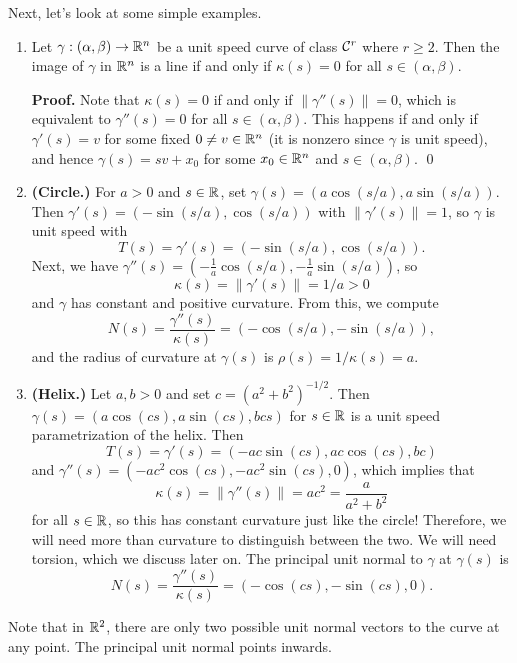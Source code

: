 Next, let's look at some simple examples. 
\begin{enumerate}[(1)]
    \item Let $\gamma : (\alpha, \beta) \to \mathbb{R}^n$ be a unit speed curve 
    of class ${\cal C}^r$ where $r \geq 2$. Then the image of $\gamma$ in $\mathbb{R}^n$ 
    is a line if and only if $\kappa(s) = 0$ for all $s \in (\alpha, \beta)$. 

    {\bf Proof.} Note that $\kappa(s) = 0$ if and only if $\|\gamma''(s)\| = 0$, 
    which is equivalent to $\gamma''(s) = 0$ for all $s \in (\alpha, \beta)$. 
    This happens if and only if $\gamma'(s) = v$ for some fixed 
    $0 \neq v \in \mathbb{R}^n$ (it is nonzero since $\gamma$ is unit speed), and 
    hence $\gamma(s) = sv + x_0$ for some $x_0 \in \mathbb{R}^n$ and $s \in 
    (\alpha, \beta)$. \qed 

    \item {\bf (Circle.)} For $a > 0$ and $s \in \mathbb{R}$, set 
    $\gamma(s) = (a\cos(s/a), a\sin(s/a))$. Then $\gamma'(s) = 
    (-\sin(s/a), \cos(s/a))$ with $\|\gamma'(s)\| = 1$, so 
    $\gamma$ is unit speed with 
    \[ T(s) = \gamma'(s) = (-\sin(s/a), \cos(s/a)). \] 
    Next, we have $\gamma''(s) = (-\frac1a\cos(s/a), -\frac1a\sin(s/a))$, so 
    \[ \kappa(s) = \|\gamma'(s)\| = 1/a > 0 \] 
    and $\gamma$ has constant and positive curvature. From this, we compute 
    \[ N(s) = \frac{\gamma''(s)}{\kappa(s)} = (-\cos(s/a), -\sin(s/a)), \]
    and the radius of curvature at $\gamma(s)$ is $\rho(s) = 1/\kappa(s) = a$.  

    \item {\bf (Helix.)} Let $a, b > 0$ and set $c = (a^2 + b^2)^{-1/2}$. Then 
    $\gamma(s) = (a\cos(cs), a\sin(cs), bcs)$
    for $s \in \mathbb{R}$ is a unit speed parametrization of the helix. Then 
    \[ T(s) = \gamma'(s) = (-ac\sin(cs), ac\cos(cs), bc) \] 
    and $\gamma''(s) = (-ac^2\cos(cs), -ac^2\sin(cs), 0)$, which implies that 
    \[ \kappa(s) = \|\gamma''(s)\| = ac^2 = \frac{a}{a^2+b^2} \] 
    for all $s \in \mathbb{R}$, so this has constant curvature just like the circle! 
    Therefore, we will need more than curvature to distinguish between the two. 
    We will need torsion, which we discuss later on. The principal unit 
    normal to $\gamma$ at $\gamma(s)$ is 
    \[ N(s) = \frac{\gamma''(s)}{\kappa(s)} = (-\cos(cs), -\sin(cs), 0). \] 
\end{enumerate}
Note that in $\mathbb{R}^2$, there are only two possible unit normal vectors to the 
curve at any point. The principal unit normal points inwards. 

